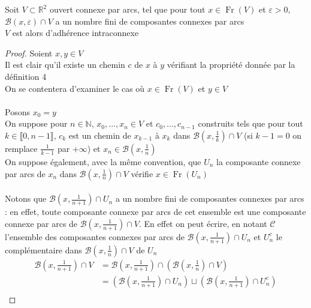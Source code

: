\documentclass{article}
\begin{document}
\begin{flushleft}
\begin{tcolorbox}[colback = purple!20!white, colframe = purple!60!white, title = Proposition 6]
    Soit $V \subset \mathbb{R}^2$ ouvert connexe par arcs, tel que pour tout $x \in \operatorname{Fr}(V)$
    et $\varepsilon > 0$, $\mathcal{B}(x, \varepsilon) \cap V$ a un nombre fini de composantes connexes par
    arcs\\
    $V$ est alors d'adhérence intraconnexe
\end{tcolorbox}

\begin{proof}
    Soient $x, y \in V$\\
    Il est clair qu'il existe un chemin $c$ de $x$ à $y$ vérifiant la propriété donnée par la définition 4\\
    On se contentera d'examiner le cas où $x \in \operatorname{Fr}(V)$ et $y \in V$
    \\~\\
    Posons $x_0 = y$\\
    On suppose pour $n \in \mathbb{N}$, $x_0, ..., x_n \in V$ et $c_0, ..., c_{n-1}$ construits tels que pour tout
    $k \in \llbracket 0, n-1 \rrbracket$, $c_k$ est un chemin de $x_{k-1}$ à $x_k$ dans
    $\mathcal{B}(x, \frac{1}{k}) \cap V$ (si $k-1 = 0$ on remplace $\frac{1}{k-1}$ par  $+\infty$)
    et $x_n \in \mathcal{B}(x, \frac{1}{n})$\\
    On suppose également, avec la même convention, que $U_n$ la composante connexe par arcs de $x_n$ dans
    $\mathcal{B}(x, \frac{1}{n}) \cap V$ vérifie $x \in \operatorname{Fr}(U_n)$
    \\~\\
    Notons que $\mathcal{B}(x, \frac{1}{n+1}) \cap U_n$ a un nombre fini de composantes connexes par arcs :
    en effet, toute composante connexe par arcs de cet ensemble est une composante connexe par arcs de
    $\mathcal{B}(x, \frac{1}{n+1}) \cap V$. En effet on peut écrire, en notant $\mathcal{C}$ l'ensemble des
    composantes connexes par arcs de $\mathcal{B}(x, \frac{1}{n+1}) \cap U_n$ et $U_n^c$ le complémentaire dans
    $\mathcal{B}(x, \frac{1}{n}) \cap V$ de $U_n$
    \begin{align*}
        \mathcal{B}\left(x, \frac{1}{n+1} \right) \cap V &= \mathcal{B}\left(x, \frac{1}{n+1}\right) \cap
        \left(\mathcal{B}\left(x, \frac{1}{n}\right)\cap V\right)\\
        &= \left(\mathcal{B}\left(x, \frac{1}{n+1}\right) \cap U_n\right) \sqcup
        \left(\mathcal{B}\left(x, \frac{1}{n+1}\right) \cap U_n^c\right)\\

\end{align*}
\end{proof}
\end{flushleft}
\end{document}

